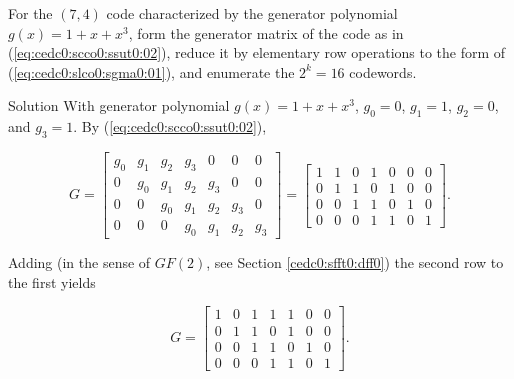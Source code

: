 \begin{vworkexamplestatement}
\label{ex:cedc0:scco0:ssut0:01}
For the $(7,4)$ code characterized by the generator polynomial 
$g(x) = 1 + x + x^3$, form the generator matrix of the code
as in (\ref{eq:cedc0:scco0:ssut0:02}), reduce it by elementary
row operations to the form of (\ref{eq:cedc0:slco0:sgma0:01}), 
and enumerate the $2^k = 16$ codewords.
\end{vworkexamplestatement}
\begin{vworkexampleparsection}{Solution}
With generator polynomial $g(x) = 1 + x + x^3$, $g_0 = 0$, $g_1 = 1$, 
$g_2 = 0$, and $g_3 = 1$.  By (\ref{eq:cedc0:scco0:ssut0:02}),

\begin{equation}
\label{eq:ex:cedc0:scco0:ssut0:01:01}
G = \left[
    \begin{array}{ccccccc}
    g_0 & g_1 & g_2 & g_3 &   0 &   0 &   0    \\
      0 & g_0 & g_1 & g_2 & g_3 &   0 &   0    \\
      0 &   0 & g_0 & g_1 & g_2 & g_3 &   0    \\
      0 &   0 &   0 & g_0 & g_1 & g_2 & g_3
    \end{array}
    \right] 
    =
    \left[
    \begin{array}{ccccccc}
      1 &   1 &   0 &   1 &   0 &   0 &   0    \\
      0 &   1 &   1 &   0 &   1 &   0 &   0    \\
      0 &   0 &   1 &   1 &   0 &   1 &   0    \\
      0 &   0 &   0 &   1 &   1 &   0 &   1
    \end{array}
    \right] .
\end{equation}

Adding (in the sense of $GF(2)$, see Section \ref{cedc0:sfft0:dff0})
the second row to the first yields

\begin{equation}
\label{eq:ex:cedc0:scco0:ssut0:01:02}
G = \left[
    \begin{array}{ccccccc}
      1 &   0 &   1 &   1 &   1 &   0 &   0    \\
      0 &   1 &   1 &   0 &   1 &   0 &   0    \\
      0 &   0 &   1 &   1 &   0 &   1 &   0    \\
      0 &   0 &   0 &   1 &   1 &   0 &   1
    \end{array}
    \right] .
\end{equation}


\end{vworkexampleparsection}

